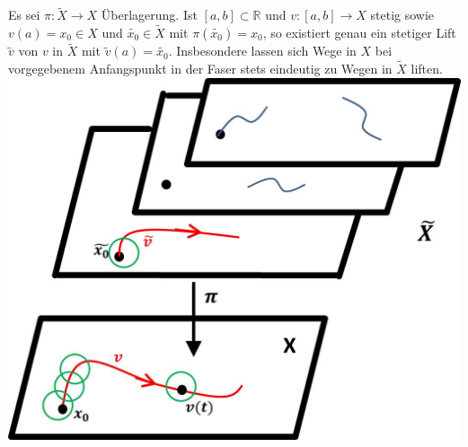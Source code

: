 \documentclass[a4paper,11pt,notitlepage]{report}
\theoremstyle{definition}
\newcommand{\R}{{\ensuremath{\mathbb{R}}}}
\begin{document}
\begin{theorem}
	Es sei $\pi \colon \widetilde{X} \rightarrow X$ Überlagerung. 
	\newline
	Ist $[a,b] \subset \R$ und $v \colon [a,b] \rightarrow X$ stetig sowie
	$v(a)=x_0 \in X$ und $\widetilde{x_0} \in \widetilde{X}$ mit $\pi(\widetilde{x_0}) = x_0$, so existiert genau ein stetiger Lift $\widetilde{v}$ von $v$ in $\widetilde{X}$ mit $\widetilde{v}(a) = \widetilde{x_0}$.
	Insbesondere lassen sich Wege in $X$ bei vorgegebenem Anfangspunkt in der Faser stets eindeutig zu Wegen in $\widetilde{X}$ liften.
\newline
\includegraphics[scale=0.4]{images/Lift_nicht_stetig.jpg}
\end{theorem}
\end{document}
